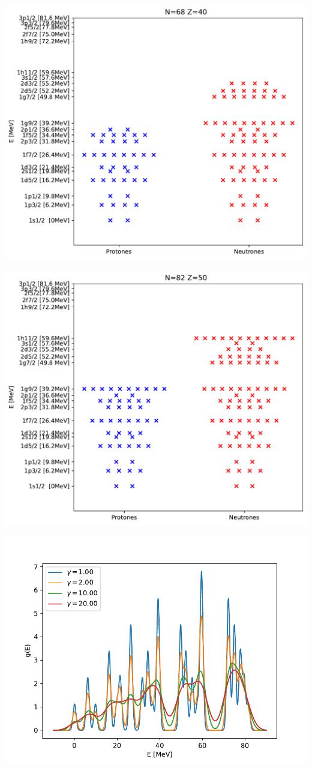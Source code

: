     \begin{center}
        \includegraphics[width=0.6\linewidth]{Cuerpo/Boletin_01/N68_Z40_Bandas.pdf}
    \end{center}
    \begin{center}
        \includegraphics[width=0.6\linewidth]{Cuerpo/Boletin_01/N82_Z50_Bandas.pdf}
    \end{center}
    \begin{center}
        \includegraphics[width=0.6\linewidth]{Cuerpo/Boletin_01/ge.pdf}
    \end{center}
